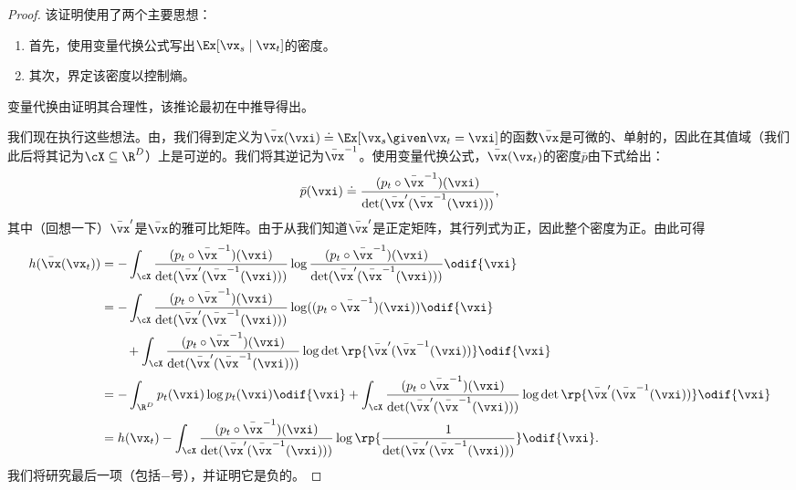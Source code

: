 \documentclass[../../book-main_zh.tex]{subfiles}
\begin{document}
\begin{proof}
    该证明使用了两个主要思想：
    \begin{enumerate}
        \item 首先，使用变量代换公式写出\(\Ex[\vx_{s} \mid \vx_{t}]\)的密度。
        \item 其次，界定该密度以控制熵。
    \end{enumerate}
    变量代换由证明其合理性，该推论最初在\cite{Gribonval2011-pf}中推导得出。

    我们现在执行这些想法。由，我们得到定义为\(\bar{\vx}(\vxi) \doteq \Ex[\vx_{s} \given \vx_{t} = \vxi]\)的函数\(\bar{\vx}\)是可微的、单射的，因此在其值域（我们此后将其记为\(\cX \subseteq \R^{D}\)）上是可逆的。我们将其逆记为\(\bar{\vx}^{-1}\)。使用变量代换公式，\(\bar{\vx}(\vx_{t})\)的密度\(\bar{p}\)由下式给出：
    \begin{equation}
        \bar{p}(\vxi) \doteq \frac{(p_{t} \circ
        \bar{\vx}^{-1})(\vxi)}{\det(\bar{\vx}^{\prime}(\bar{\vx}^{-1}(\vxi)))},
    \end{equation}
    其中（回想一下）\(\bar{\vx}^{\prime}\)是\(\bar{\vx}\)的雅可比矩阵。由于从我们知道\(\bar{\vx}^{\prime}\)是正定矩阵，其行列式为正，因此整个密度为正。由此可得
    \begin{align}
        h(\bar{\vx}(\vx_{t}))
        &= -\int_{\cX}\frac{(p_{t} \circ
        \bar{\vx}^{-1})(\vxi)}{\det(\bar{\vx}^{\prime}(\bar{\vx}^{-1}(\vxi)))}
        \log \frac{(p_{t} \circ
        \bar{\vx}^{-1})(\vxi)}{\det(\bar{\vx}^{\prime}(\bar{\vx}^{-1}(\vxi)))}
        \odif{\vxi} \\
        &= -\int_{\cX}\frac{(p_{t} \circ
        \bar{\vx}^{-1})(\vxi)}{\det(\bar{\vx}^{\prime}(\bar{\vx}^{-1}(\vxi)))}
        \log((p_{t} \circ \bar{\vx}^{-1})(\vxi))\odif{\vxi} \\
        &\qquad + \int_{\cX}\frac{(p_{t} \circ
        \bar{\vx}^{-1})(\vxi)}{\det(\bar{\vx}^{\prime}(\bar{\vx}^{-1}(\vxi)))}\log\det\rp{\bar{\vx}^{\prime}(\bar{\vx}^{-1}(\vxi))}\odif{\vxi}
        \\
        &= -\int_{\R^{D}}p_{t}(\vxi)\log p_{t}(\vxi)\odif{\vxi}
        + \int_{\cX}\frac{(p_{t} \circ
        \bar{\vx}^{-1})(\vxi)}{\det(\bar{\vx}^{\prime}(\bar{\vx}^{-1}(\vxi)))}\log\det\rp{\bar{\vx}^{\prime}(\bar{\vx}^{-1}(\vxi))}\odif{\vxi}
        \\
        &= h(\vx_{t}) - \int_{\cX}\frac{(p_{t} \circ
        \bar{\vx}^{-1})(\vxi)}{\det(\bar{\vx}^{\prime}(\bar{\vx}^{-1}(\vxi)))}\log\rp{\frac{1}{\det(\bar{\vx}^{\prime}(\bar{\vx}^{-1}(\vxi)))}}\odif{\vxi}.
    \end{align}
    我们将研究最后一项（包括\(-\)号），并证明它是负的。


\end{proof}
\end{document}
